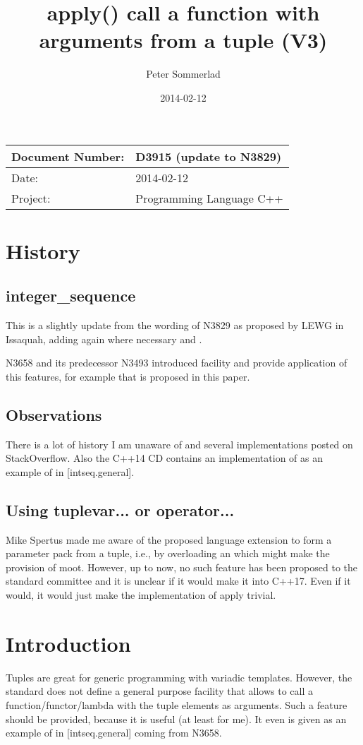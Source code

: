 \documentclass[ebook,11pt,article]{memoir}
\title{apply() call a function with arguments from a tuple (V3)
}
\author{Peter Sommerlad}
\date{2014-02-12}                                           %
\begin{document}
\maketitle
\begin{tabular}[t]{|l|l|}\hline 
Document Number: & D3915 (update to N3829) \\\hline
Date: & 2014-02-12 \\\hline
Project: & Programming Language C++\\\hline 
\end{tabular}
\chapter{History}
\section{integer_sequence}
This is a slightly update from the wording of N3829 as proposed by LEWG in Issaquah, adding  again where necessary and .

N3658 and its predecessor N3493 introduced  facility and provide application of this features, for example  that is proposed in this paper.
\section{Observations}
There is a lot of history I am unaware of and several implementations posted on StackOverflow. Also the C++14 CD contains an implementation of  as an example of  in [intseq.general].
\section{Using tuplevar... or operator...}
Mike Spertus made me aware of the proposed language extension to form a parameter pack from a tuple, i.e., by overloading an  which might make the provision of  moot. However, up to now, no such feature has been proposed to the standard committee and it is unclear if it would make it into C++17. Even if it would, it would just make the implementation of apply trivial.
\chapter{Introduction}
Tuples are great for generic programming with variadic templates. However, the standard does not define a general purpose facility that allows to call a function/functor/lambda with the tuple elements as arguments. Such a feature should be provided, because it is useful (at least for me). It even is given as an example of  in [intseq.general] coming from N3658. 
\end{document}
